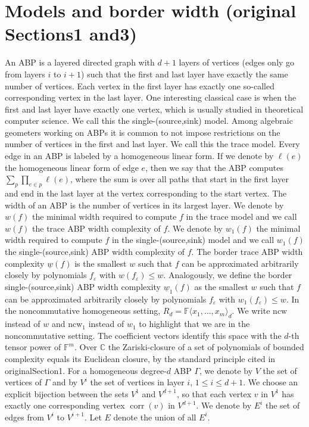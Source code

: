 \documentclass[10pt,a4paper]{article}
\newcommand{\C}{\mathbb C}
\newcommand{\ncw}{\mathrm{ncw}}
\begin{document}
\section*{Models and border width (original Sections1 and3)}
An ABP is a layered directed graph with $d+1$ layers of vertices (edges only go from layers $i$ to $i+1$) such that the first and last layer have exactly the same number of vertices. Each vertex in the first layer has exactly one so-called corresponding vertex in the last layer. One interesting classical case is when the first and last layer have exactly one vertex, which is usually studied in theoretical computer science. We call this the single-(source,sink) model. Among algebraic geometers working on ABPs it is common to not impose restrictions on the number of vertices in the first and last layer. We call this the trace model. Every edge in an ABP is labeled by a homogeneous linear form. If we denote by $\ell(e)$ the homogeneous linear form of edge $e$, then we say that the ABP computes $\sum_p\prod_{e\in p}\ell(e)$, where the sum is over all paths that start in the first layer and end in the last layer at the vertex corresponding to the start vertex.
The width of an ABP is the number of vertices in its largest layer. We denote by $w(f)$ the minimal width required to compute $f$ in the trace model and we call $w(f)$ the trace ABP width complexity of $f$. We denote by $w_1(f)$ the minimal width required to compute $f$ in the single-(source,sink) model and we call $w_1(f)$ the single-(source,sink) ABP width complexity of $f$.
The border trace ABP width complexity $\underline w(f)$ is the smallest $w$ such that $f$ can be approximated arbitrarily closely by polynomials $f_\varepsilon$ with $w(f_\varepsilon)\le w$. Analogously, we define the border single-(source,sink) ABP width complexity $\underline w_1(f)$ as the smallest $w$ such that $f$ can be approximated arbitrarily closely by polynomials $f_\varepsilon$ with $w_1(f_\varepsilon)\le w$.
In the noncommutative homogeneous setting, $R_d=\mathbb F\langle x_1,\ldots,x_m\rangle_d$. We write $\ncw$ instead of $w$ and $\ncw_1$ instead of $w_1$ to highlight that we are in the noncommutative setting. The coefficient vectors identify this space with the $d$-th tensor power of $\mathbb F^m$. Over $\C$ the Zariski-closure of a set of polynomials of bounded complexity equals its Euclidean closure, by the standard principle cited in originalSection1.
For a homogeneous degree-$d$ ABP $\Gamma$, we denote by $V$ the set of vertices of $\Gamma$ and by $V^i$ the set of vertices in layer $i$, $1\le i\le d+1$. We choose an explicit bijection between the sets $V^1$ and $V^{d+1}$, so that each vertex $v$ in $V^1$ has exactly one corresponding vertex $\operatorname{corr}(v)$ in $V^{d+1}$. We denote by $E^i$ the set of edges from $V^i$ to $V^{i+1}$. Let $E$ denote the union of all $E^i$.
\end{document}
